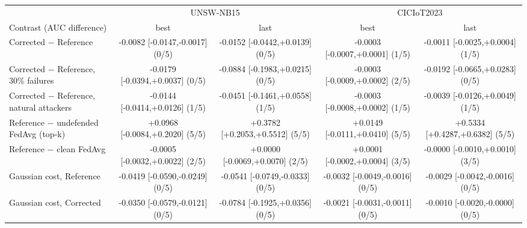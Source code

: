 \begin{tabular}{@{}lcccc@{}}\toprule
 & \multicolumn{2}{c}{UNSW-NB15} & \multicolumn{2}{c}{CICIoT2023}\\\cmidrule(lr){2-3}\cmidrule(lr){4-5}
Contrast (AUC difference) & best & last & best & last\\\midrule
Corrected $-$ Reference & -0.0082 [-0.0147,-0.0017] (0/5) & -0.0152 [-0.0442,+0.0139] (0/5) & -0.0003 [-0.0007,+0.0001] (1/5) & -0.0011 [-0.0025,+0.0004] (1/5) \\
Corrected $-$ Reference, 30\% failures & -0.0179 [-0.0394,+0.0037] (0/5) & -0.0884 [-0.1983,+0.0215] (0/5) & -0.0003 [-0.0009,+0.0002] (2/5) & -0.0192 [-0.0665,+0.0283] (0/5) \\
Corrected $-$ Reference, natural attackers & -0.0144 [-0.0414,+0.0126] (1/5) & -0.0451 [-0.1461,+0.0558] (1/5) & -0.0003 [-0.0008,+0.0002] (1/5) & -0.0039 [-0.0126,+0.0049] (1/5) \\
Reference $-$ undefended FedAvg (top-k) & +0.0968 [-0.0084,+0.2020] (5/5) & +0.3782 [+0.2053,+0.5512] (5/5) & +0.0149 [-0.0111,+0.0410] (5/5) & +0.5334 [+0.4287,+0.6382] (5/5) \\
Reference $-$ clean FedAvg & -0.0005 [-0.0032,+0.0022] (2/5) & +0.0000 [-0.0069,+0.0070] (2/5) & +0.0001 [-0.0002,+0.0004] (3/5) & -0.0000 [-0.0010,+0.0010] (3/5) \\
Gaussian cost, Reference & -0.0419 [-0.0590,-0.0249] (0/5) & -0.0541 [-0.0749,-0.0333] (0/5) & -0.0032 [-0.0049,-0.0016] (0/5) & -0.0029 [-0.0042,-0.0016] (0/5) \\
Gaussian cost, Corrected & -0.0350 [-0.0579,-0.0121] (0/5) & -0.0784 [-0.1925,+0.0356] (0/5) & -0.0021 [-0.0031,-0.0011] (0/5) & -0.0010 [-0.0020,-0.0000] (0/5) \\
\bottomrule\end{tabular}
